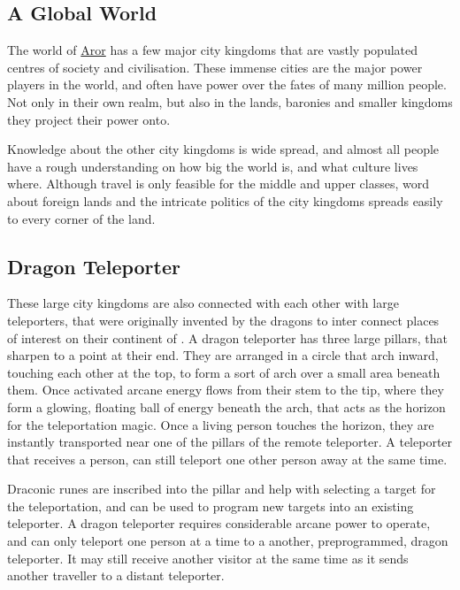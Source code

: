 \subsection{A Global World}

The world of \hyperref[sec:Aror]{Aror} has a few major city kingdoms that are
vastly populated centres of society and civilisation. These immense cities are
the major power players in the world, and often have power over the fates of
many million people. Not only in their own realm, but also in the lands,
baronies and smaller kingdoms they project their power onto.

Knowledge about the other city kingdoms is wide spread, and almost all people
have a rough understanding on how big the world is, and what culture lives
where. Although travel is only feasible for the middle and upper classes, word
about foreign lands and the intricate politics of the city kingdoms spreads
easily to every corner of the land.

\subsection{Dragon Teleporter}
\label{sec:Dragon Teleporter}

These large city kingdoms are also connected with each other with large
teleporters, that were originally invented by the dragons to inter connect
places of interest on their continent of . A dragon
teleporter has three large pillars, that sharpen to a point at their end. They
are arranged in a circle that arch inward, touching each other at the top, to
form a sort of arch over a small area beneath them. Once activated arcane
energy flows from their stem to the tip, where they form a glowing, floating
ball of energy beneath the arch, that acts as the horizon for the
teleportation magic. Once a living person touches the horizon, they are
instantly transported near one of the pillars of the remote teleporter. A
teleporter that receives a person, can still teleport one other person away at
the same time.

Draconic runes are inscribed into the pillar and help with selecting a target
for the teleportation, and can be used to program new targets into an existing
teleporter. A dragon teleporter requires considerable arcane power to operate,
and can only teleport one person at a time to a another, preprogrammed, dragon
teleporter. It may still receive another visitor at the same time as it sends
another traveller to a distant teleporter.

